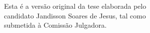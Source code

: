 \documentclass[11pt,twoside,a4paper]{book}
\begin{document}
    \vskip 2cm

    \begin{flushright}
	Esta é a versão original da tese elaborada pelo\\
	candidato Jandisson Soares de Jesus, tal como \\
	submetida à Comissão Julgadora.
    \end{flushright}

\pagebreak


%
%
%
%





    
      
\end{document}
